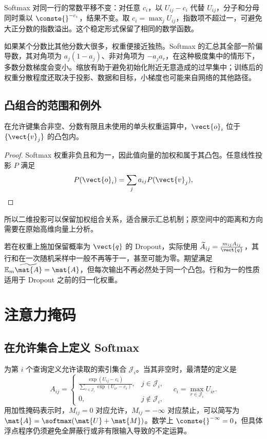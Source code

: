 \documentclass[../textbook.tex]{subfiles}
\begin{document}
Softmax 对同一行的常数平移不变：对任意 $c_i$，以 $U_{ij}-c_i$ 代替 $U_{ij}$，分子和分母同时乘以 $\conste{}^{-c_i}$，结果不变。取 $c_i=\max_j U_{ij}$，指数项不超过一，可避免大正分数的指数溢出。这个稳定形式保留了相同的数学函数。

如果某个分数比其他分数大很多，权重便接近独热。Softmax 的汇总其全部一阶偏导数，其对角项为 $a_j(1-a_j)$、非对角项为 $-a_ja_r$，在这种极度集中的情形下，多数分数梯度会变小。缩放有助于避免初始化附近无意造成的过早集中；训练后的权重分散程度还取决于投影、数据和目标，小梯度也可能来自网络的其他路径。

\subsection{凸组合的范围和例外}
\begin{proposition}[注意力输出的凸组合性质]
在允许键集合非空、分数有限且未使用的单头权重运算中，$\vect{o}_i$ 位于 $\{\vect{v}_j\}$ 的凸包内。\end{proposition}
\begin{proof}
Softmax 权重非负且和为一，因此值向量的加权和属于其凸包。任意线性投影 $P$ 满足
\begin{equation}
 P(\vect{o}_i)=\sum_j a_{ij}P(\vect{v}_j),
\end{equation}
\end{proof}
所以二维投影可以保留加权组合关系，适合展示汇总机制；原空间中的距离和方向需要在原始高维向量上分析。

若在权重上施加保留概率为 $\vect{q}$ 的 Dropout，实际使用 $\widetilde A_{ij}=\frac{m_{ij}A_{ij}}{\vect{q}}$，其行和在一次随机采样中一般不再等于一，甚至可能为零。期望满足 $\mathbb E_m\widetilde{\mat{A}}=\mat{A}$，但每次输出不再必然处于同一个凸包。行和为一的性质适用于 Dropout 之前的归一化权重。

\section{注意力掩码}

\subsection{在允许集合上定义 Softmax}
为第 $i$ 个查询定义允许读取的索引集合 $\mathcal J_i$。当其非空时，最清楚的定义是
\begin{equation}
 A_{ij}=\begin{cases}
 \displaystyle\frac{\exp(U_{ij}-c_i)}{\sum_{r\in\mathcal J_i}\exp(U_{ir}-c_i)},&j\in\mathcal J_i,\\[6pt]
 0,&j\notin\mathcal J_i,
 \end{cases}
 \quad c_i=\max_{r\in\mathcal J_i}U_{ir}.\label{eq:attn-mask-set}
\end{equation}
用加性掩码表示时，$M_{ij}=0$ 对应允许，$M_{ij}=-\infty$ 对应禁止，可以简写为 $\mat{A}=\softmax(\mat{U}+\mat{M})$。数学上 $\conste{}^{-\infty}=0$，但具体浮点程序仍须避免全屏蔽行或非有限输入导致的不定运算。
\end{document}
